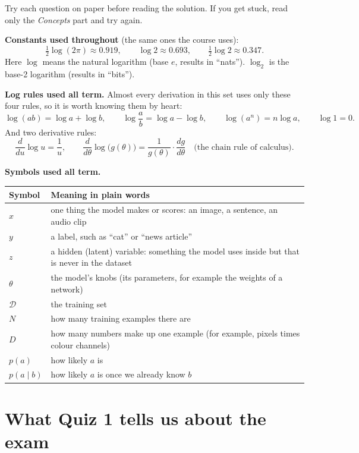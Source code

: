 \documentclass[12pt,a4paper]{article}
\begin{document}
Try each question on paper before reading the solution. If you get stuck, read only the \emph{Concepts} part and try again.

\textbf{Constants used throughout} (the same ones the course uses):
\[
\tfrac12\log(2\pi)\approx 0.919,\qquad \log 2\approx 0.693,\qquad \tfrac12\log 2\approx 0.347 .
\]
Here $\log$ means the natural logarithm (base $e$, results in ``nats''). $\log_2$ is the base-2 logarithm (results in ``bits'').

\textbf{Log rules used all term.} Almost every derivation in this set uses only these four rules, so it is worth knowing them by heart:
\[
\log(ab)=\log a+\log b,\qquad \log\frac{a}{b}=\log a-\log b,\qquad \log(a^n)=n\log a,\qquad \log 1=0 .
\]
And two derivative rules:
\[
\frac{d}{du}\log u=\frac1u,\qquad \frac{d}{d\theta}\log\big(g(\theta)\big)=\frac{1}{g(\theta)}\cdot\frac{dg}{d\theta}\quad\text{(the chain rule of calculus).}
\]

\textbf{Symbols used all term.}
\begin{center}
\begin{tabular}{@{}l>{\raggedright\arraybackslash}p{}@{}}
\toprule
Symbol & Meaning in plain words \\
\midrule
$x$ & one thing the model makes or scores: an image, a sentence, an audio clip \\
$y$ & a label, such as ``cat'' or ``news article'' \\
$z$ & a hidden (latent) variable: something the model uses inside but that is never in the dataset \\
$\theta$ & the model's knobs (its parameters, for example the weights of a network) \\
$\mathcal{D}$ & the training set \\
$N$ & how many training examples there are \\
$D$ & how many numbers make up one example (for example, pixels times colour channels) \\
$p(a)$ & how likely $a$ is \\
$p(a\mid b)$ & how likely $a$ is once we already know $b$ \\
\bottomrule
\end{tabular}
\end{center}

\section{What Quiz 1 tells us about the exam}
\end{document}
